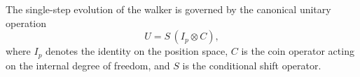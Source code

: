 The single-step evolution of the walker is governed by the canonical
unitary operation
\begin{equation}
  U = S \, (I_p \otimes C),
  \label{eq:general-evolution}
\end{equation}
where $I_p$ denotes the identity on the position space, $C$ is the coin
operator acting on the internal degree of freedom, and $S$ is the
conditional shift operator.
